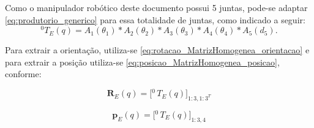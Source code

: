 Como o manipulador robótico deste documento possui 5 juntas, pode-se adaptar \eqref{eq:produtorio_generico} para essa totalidade de juntas, como indicado a seguir:
\begin{equation}
{}^{0}\!T_E(q)=
A_1(\theta_1)*
A_2(\theta_2)*
A_3(\theta_3)*
A_4(\theta_4)*
A_5(d_5).
\end{equation}

Para extrair a orientação, utiliza-se \eqref{eq:rotacao_MatrizHomogenea_orientacao} e para extrair a posição utiliza-se \eqref{eq:posicao_MatrizHomogenea_posicao}, conforme:

\begin{equation}
    \label{eq:rotacao_MatrizHomogenea_orientacao}
\mathbf{R}_E(q) = \big[{}^{0}\,T_E(q)\big]_{1:3, {1:3^T}}
\end{equation}

\begin{equation}
    \label{eq:posicao_MatrizHomogenea_posicao}
\mathbf{p}_E(q) = \big[{}^{0}\,T_E(q)\big]_{1:3, 4}
\end{equation}
